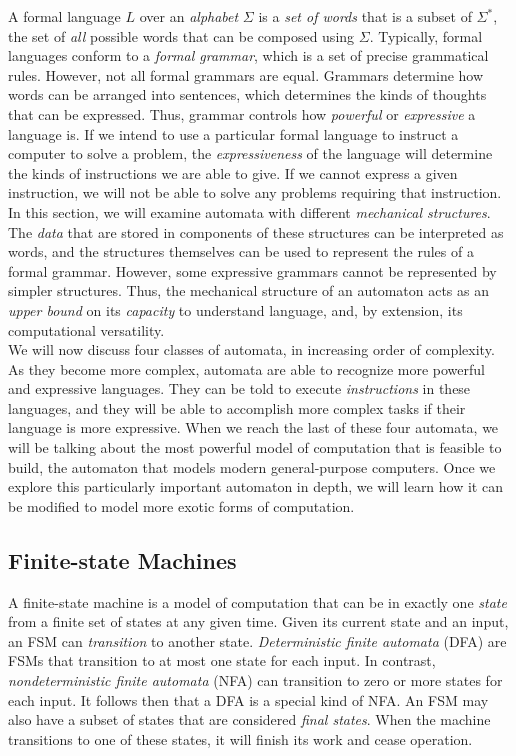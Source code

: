 A formal language $L$ over an \textit{alphabet} $\Sigma$ is a \textit{set of words} that is a subset of $\Sigma^*$, the set of \textit{all} possible words that can be composed using $\Sigma$. Typically, formal languages conform to a \textit{formal grammar}, which is a set of precise grammatical rules. However, not all formal grammars are equal. Grammars determine how words can be arranged into sentences, which determines the kinds of thoughts that can be expressed. Thus, grammar controls how \textit{powerful} or \textit{expressive} a language is. If we intend to use a particular formal language to instruct a computer to solve a problem, the \textit{expressiveness} of the language will determine the kinds of instructions we are able to give. If we cannot express a given instruction, we will not be able to solve any problems requiring that instruction. \\

In this section, we will examine automata with different \textit{mechanical structures}. The \textit{data} that are stored in components of these structures can be interpreted as words, and the structures themselves can be used to represent the rules of a formal grammar. However, some expressive grammars cannot be represented by simpler structures. Thus, the mechanical structure of an automaton acts as an \textit{upper bound} on its \textit{capacity} to understand language, and, by extension, its computational versatility. \\

We will now discuss four classes of automata, in increasing order of complexity. As they become more complex, automata are able to recognize more powerful and expressive languages. They can be told to execute \textit{instructions} in these languages, and they will be able to accomplish more complex tasks if their language is more expressive. When we reach the last of these four automata, we will be talking about the most powerful model of computation that is feasible to build, the automaton that models modern general-purpose computers. Once we explore this particularly important automaton in depth, we will learn how it can be modified to model more exotic forms of computation. \\

\subsection{Finite-state Machines}

A finite-state machine is a model of computation that can be in exactly one \textit{state} from a finite set of states at any given time. Given its current state and an input, an FSM can \textit{transition} to another state. \textit{Deterministic finite automata} (DFA) are FSMs that transition to at most one state for each input. In contrast, \textit{nondeterministic finite automata} (NFA) can transition to zero or more states for each input. It follows then that a DFA is a special kind of NFA. An FSM may also have a subset of states that are considered \textit{final states}. When the machine transitions to one of these states, it will finish its work and cease operation. \\

